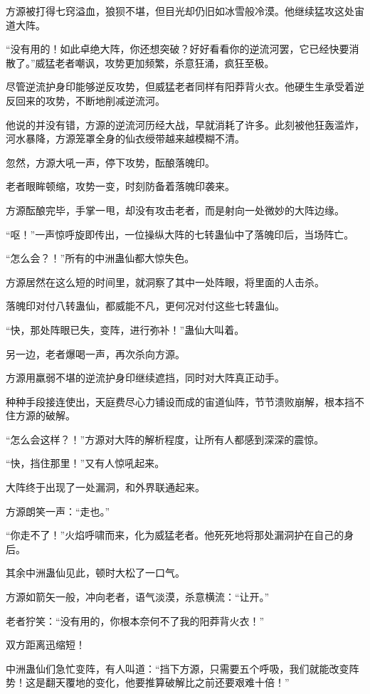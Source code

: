 \begin{this_body}
方源被打得七窍溢血，狼狈不堪，但目光却仍旧如冰雪般冷漠。他继续猛攻这处宙道大阵。

“没有用的！如此卓绝大阵，你还想突破？好好看看你的逆流河罢，它已经快要消散了。”威猛老者嘲讽，攻势更加频繁，杀意狂涌，疯狂至极。

尽管逆流护身印能够逆反攻势，但威猛老者同样有阳莽背火衣。他硬生生承受着逆反回来的攻势，不断地削减逆流河。

他说的并没有错，方源的逆流河历经大战，早就消耗了许多。此刻被他狂轰滥炸，河水暴降，方源笼罩全身的仙衣绶带越来越模糊不清。

忽然，方源大吼一声，停下攻势，酝酿落魄印。

老者眼眸顿缩，攻势一变，时刻防备着落魄印袭来。

方源酝酿完毕，手掌一甩，却没有攻击老者，而是射向一处微妙的大阵边缘。

“呕！”一声惊呼旋即传出，一位操纵大阵的七转蛊仙中了落魄印后，当场阵亡。

“怎么会？！”所有的中洲蛊仙都大惊失色。

方源居然在这么短的时间里，就洞察了其中一处阵眼，将里面的人击杀。

落魄印对付八转蛊仙，都威能不凡，更何况对付这些七转蛊仙。

“快，那处阵眼已失，变阵，进行弥补！”蛊仙大叫着。

另一边，老者爆喝一声，再次杀向方源。

方源用羸弱不堪的逆流护身印继续遮挡，同时对大阵真正动手。

种种手段接连使出，天庭费尽心力铺设而成的宙道仙阵，节节溃败崩解，根本挡不住方源的破解。

“怎么会这样？！”方源对大阵的解析程度，让所有人都感到深深的震惊。

“快，挡住那里！”又有人惊吼起来。

大阵终于出现了一处漏洞，和外界联通起来。

方源朗笑一声：“走也。”

“你走不了！”火焰呼啸而来，化为威猛老者。他死死地将那处漏洞护在自己的身后。

其余中洲蛊仙见此，顿时大松了一口气。

方源如箭矢一般，冲向老者，语气淡漠，杀意横流：“让开。”

老者狞笑：“没有用的，你根本奈何不了我的阳莽背火衣！”

双方距离迅缩短！

中洲蛊仙们急忙变阵，有人叫道：“挡下方源，只需要五个呼吸，我们就能改变阵势！这是翻天覆地的变化，他要推算破解比之前还要艰难十倍！”


\end{this_body}
